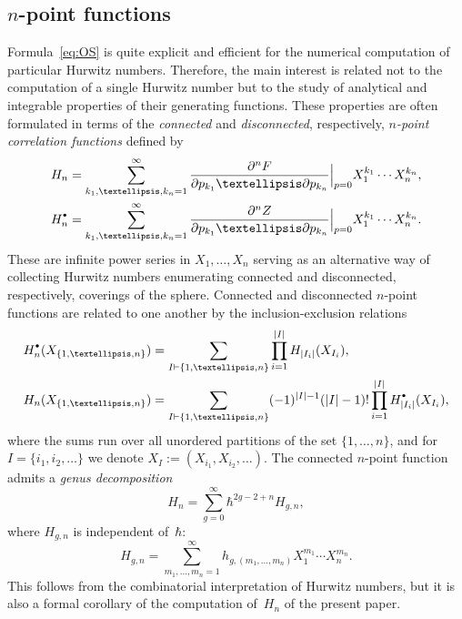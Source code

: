 \documentclass[11pt]{article}
\newcommand{\sbullet}{{\scriptscriptstyle\bullet}}
\newcommand{\csbullet}{{\raisebox{1pt}{$\sbullet$}}}
\theoremstyle{plain}
\theoremstyle{definition}
\theoremstyle{remark}
\newcommand{\Hd}{H^\csbullet}
\begin{document}
\subsection{\texorpdfstring{$n$}{n}-point functions}

Formula~\eqref{eq:OS} is quite explicit and efficient for the numerical computation of particular Hurwitz numbers. Therefore, the main interest is related not to the computation of a single Hurwitz number but to the study of analytical and integrable properties of their generating functions. These properties are often formulated in terms of the \emph{connected} and \emph{disconnected}, respectively, \emph{$n$-point correlation functions} defined by\vspace*{-3pt}
\begin{align}\label{eq:Hndef}
H_n&=\sum_{k_1,\dots,k_n=1}^\infty\frac{\partial^n F}{\partial p_{k_1}\dots\partial p_{k_n}}\Big|_{p=0}X_1^{k_1}\cdots X_n^{k_n},\\ \label{eq:Hdndef}
\Hd_n&=\sum_{k_1,\dots,k_n=1}^\infty\frac{\partial^n Z}{\partial p_{k_1}\dots\partial p_{k_n}}\Big|_{p=0}X_1^{k_1}\cdots X_n^{k_n}.
\end{align}
These are infinite power series in $X_1,\dots,X_n$ serving as an alternative way of collecting Hurwitz numbers enumerating connected and disconnected, respectively, coverings of the sphere. Connected and disconnected $n$-point functions are related to one another by the inclusion-exclusion relations\vspace*{-3pt}
\begin{equation}\label{eq:inclexclH}
\begin{aligned}
\Hd_n(X_{\{1,\dots,n\}})&= \sum\limits_{I\vdash\{1,\ldots,n\}}\prod\limits_{i=1}^{|I|}H_{|I_i|}(X_{I_i}),\\
H_n(X_{\{1,\dots,n\}})&= \sum\limits_{I\vdash\{1,\ldots,n\}}(-1)^{|I|-1}(|I|-1)!\prod\limits_{i=1}^{|I|}\Hd_{|I_i|}(X_{I_i}),
\end{aligned}
\end{equation}
where the sums run over all unordered partitions of the set $\{1,\dots,n\}$, and for $I=\{i_1,i_2,\dots\}$ we denote $X_I:=(X_{i_1},X_{i_2},\dots)$. The connected $n$-point function admits a \emph{genus decomposition}
\begin{equation*}
H_n=\sum_{g=0}^\infty \hbar^{2g-2+n}H_{g,n},
\end{equation*}
where $H_{g,n}$ is independent of~$\hbar$:
\begin{equation*}
H_{g,n}=\sum_{m_1,\dots,m_n=1}^\infty h_{g,(m_1,\dots,m_n)}X_1^{m_1}\cdots X_n^{m_n}.
\end{equation*}
This follows from the combinatorial interpretation of Hurwitz numbers, but it is also a formal corollary of the computation of~$H_{n}$ of the present paper.
\end{document}
